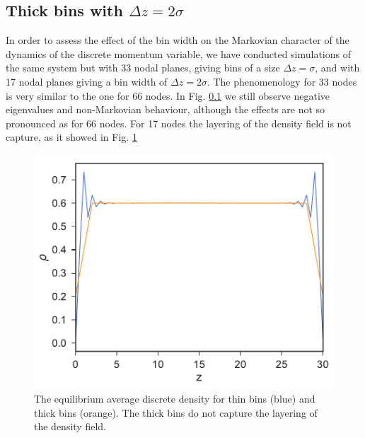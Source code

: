 \documentclass[a4paper,openright,12pt]{book}
\newcommand{\Pendiente}[1]{{\color{green}#1}} %
\begin{document}
\subsection{Thick bins with $\Delta z = 2\sigma$}
In  order to  assess the  effect  of the  bin width  on the  Markovian
character of the  dynamics of the discrete momentum  variable, we have
conducted simulations  of the  same system but  with 33  nodal planes,
giving bins  of a  size $\Delta  z=\sigma$, and  with 17  nodal planes
giving a  bin width of  $\Delta z=2\sigma$.  The phenomenology  for 33
nodes  is very  similar to  the one  for 66  nodes.  
\Pendiente{In Fig. \ref{} we still observe negative eigenvalues and non-Markovian behaviour, although the effects are not so pronounced as for 66 nodes.}  
For 17 nodes the layering of the density field is not capture, as it showed in Fig. \ref{fig:DensityProfile-WALLS}
\begin{figure}[h!]
  \centering
\includegraphics[scale=0.45]{DensityProfile-WALLS}
\caption[Fluid density profile for 66 and 17 nodes.]{The equilibrium average discrete density for thin bins (blue) and thick bins (orange). The thick bins do not capture the layering of the density field.}
\label{fig:DensityProfile-WALLS}
\end{figure}
\end{document}
